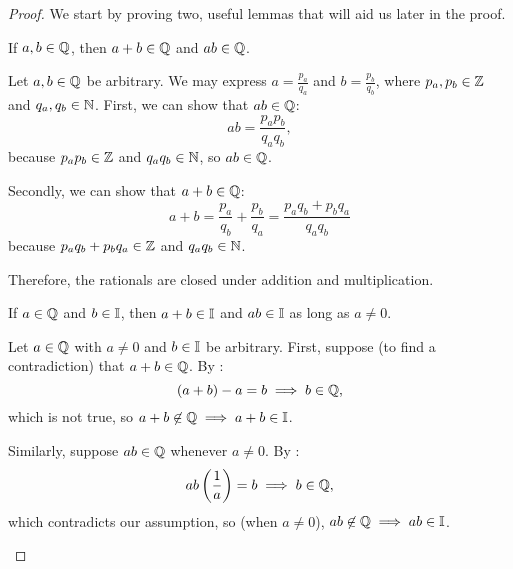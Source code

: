\begin{proof}
  We start by proving two, useful lemmas that will aid us later in the proof.

    \begin{lemma}\label{lem:rationals-closed-under-addition-multiplication}
      If $a, b \in \mathbb{Q}$, then $a + b \in \mathbb{Q}$ and $ab \in \mathbb{Q}$.
    \end{lemma}

      \begin{subproof}
        Let $a, b \in \mathbb{Q}$ be arbitrary. We may express $a = \frac{p_{a}}{q_{a}}$ and $b = \frac{p_{b}}{q_{b}}$, 
        where $p_{a}, p_{b} \in \mathbb{Z}$ and $q_{a}, q_{b} \in \mathbb{N}$.
        First, we can show that $ab \in \mathbb{Q}$:
        \[
          ab = \frac{p_{a}p_{b}}{q_{a}q_{b}},
        \]
        because $p_{a}p_{b} \in \mathbb{Z}$ and $q_{a}q_{b} \in \mathbb{N}$, so $ab \in \mathbb{Q}$.

        Secondly, we can show that $a + b \in \mathbb{Q}$:
        \[
          a + b = \frac{p_{a}}{q_{b}} + \frac{p_{b}}{q_{a}} = \frac{p_{a}q_{b} + p_{b}q_{a}}{q_{a}q_{b}}
        \]
        because $p_{a}q_{b} + p_{b}q_{a} \in \mathbb{Z}$ and $q_{a}q_{b} \in \mathbb{N}$.

        Therefore, the rationals are closed under addition and multiplication. 
      \end{subproof}

    \begin{lemma}\label{lem:rational-irrational-addition-multiplication}
      If $a \in \mathbb{Q}$ and $b \in \mathbb{I}$\footnotemark{}, then $a + b \in \mathbb{I}$ and $ab \in \mathbb{I}$ as long as $a \neq 0$.
    \end{lemma}

    \begin{subproof}
      Let $a \in \mathbb{Q}$ with $a \neq 0$ and $b \in \mathbb{I}$ be arbitrary. 
      First, suppose (to find a contradiction) that $a + b \in \mathbb{Q}$. By :
      \[
        (a + b) - a = b \implies b \in \mathbb{Q},
      \]
      which is not true, so $a + b \not\in \mathbb{Q} \implies a + b \in \mathbb{I}$.

      Similarly, suppose $ab \in \mathbb{Q}$ whenever $a \neq 0$. By :
      \[
        ab \left( \frac{1}{a} \right) = b \implies b \in \mathbb{Q},
      \]
      which contradicts our assumption, so (when $a \neq 0$), $ab \not\in \mathbb{Q} \implies ab \in \mathbb{I}$.
    \end{subproof}


\end{proof}
